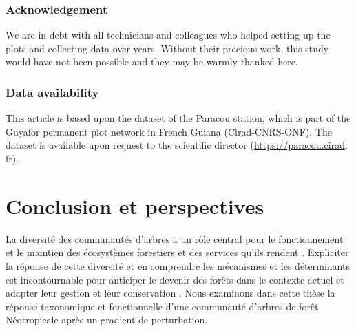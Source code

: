 \documentclass[
  11pt,
  french,
  A4paper,
  extrafontsizes,onecolumn,openright
  ]{memoir}
\begin{document}
\subsection{Acknowledgement}\label{acknowledgement-1}

We are in debt with all technicians and colleagues who helped setting up
the plots and collecting data over years. Without their precious work,
this study would have not been possible and they may be warmly thanked
here.

\subsection{Data availability}\label{data-availability-1}

This article is based upon the dataset of the Paracou station, which is
part of the Guyafor permanent plot network in French Guiana
(Cirad-CNRS-ONF). The dataset is available upon request to the
scientific director (\url{https://paracou.cirad}. fr).

\chapter{Conclusion et perspectives}\label{conclusion-et-perspectives}

La diversité des communautés d'arbres a un rôle central pour le
fonctionnement et le maintien des écosystèmes forestiers et des services
qu'ils rendent \autocite{Liang2016}. Expliciter la réponse de cette
diversité et en comprendre les mécanismes et les déterminants est
incontournable pour anticiper le devenir des forêts dans le contexte
actuel et adapter leur gestion et leur conservation
\autocite{Barlow2018}. Nous examinons dans cette thèse la réponse
taxonomique et fonctionnelle d'une communauté d'arbres de forêt
Néotropicale après un gradient de perturbation.
\end{document}
